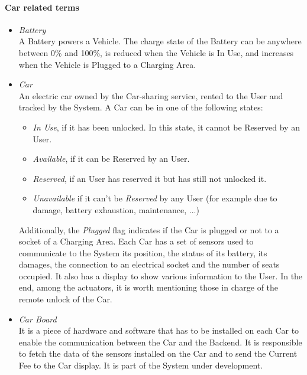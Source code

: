 \paragraph{Car related terms}
\begin{itemize}
	\item \emph{Battery} \\
	A Battery powers a Vehicle. The charge state of the Battery can be anywhere between 0\% and 100\%, is reduced when the Vehicle is In Use, and increases when the Vehicle is Plugged to a Charging Area.
		
	\item \emph{Car} \\
	An electric car owned by the Car-sharing service, rented to the User and tracked by the System. A Car can be in one of the following states:
	\begin{itemize}
		\item \textit{In Use}, if it has been unlocked. In this state, it cannot be Reserved by an User.
		\item \textit{Available}, if it can be Reserved by an User.
		\item \textit{Reserved}, if an User has reserved it but has still not unlocked it.
		\item \textit{Unavailable} if it can't be \textit{Reserved} by any User (for example due to damage, battery exhaustion, maintenance, ...)
	\end{itemize}
	Additionally, the \textit{Plugged} flag indicates if the {Car} is plugged or not to a socket of a Charging Area.
	Each Car has a set of sensors used to communicate to the System its position, the status of its battery, its damages, the connection to an electrical socket and the number of seats occupied. It also has a display to show various information to the User. In the end, among the actuators, it is worth mentioning those in charge of the remote unlock of the Car.
	
	\item \emph{Car Board} \\
	It is a piece of hardware and software that has to be installed on each Car to enable the communication between the Car and the Backend. It is responsible to fetch the data of the sensors installed on the Car and to send the Current Fee to the Car display. It is part of the System under development.
				

\end{itemize}
